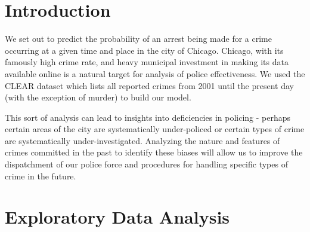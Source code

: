 \documentclass[10pt]{SelfArx} %
\begin{document}
\flushbottom %

\noindent \maketitle %



\thispagestyle{empty} %


\section{Introduction} %
We set out to predict the probability of an arrest being made for a crime occurring at a given time and place in the city of Chicago. Chicago, with its famously high crime rate, and heavy municipal investment in making its data available online is a natural target for analysis of police effectiveness. We used the CLEAR dataset which lists all reported crimes from 2001 until the present day (with the exception of murder) to build our model.

This sort of analysis can lead to insights into deficiencies in policing - perhaps certain areas of the city are systematically under-policed or certain types of crime are systematically under-investigated. Analyzing the nature and features of crimes committed in the past to identify these biases will allow us to improve the dispatchment of our police force and procedures for handling specific types of crime in the future.

\section{Exploratory Data Analysis}
\end{document}
